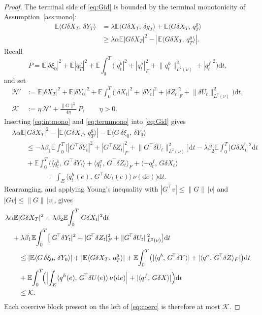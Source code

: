 \documentclass[preprint,12pt]{elsarticle}
\newcommand{\E}{\mathbb{E}}
\newcommand{\diff}{\mathrm{d}}
\newcommand{\inner}[2]{\langle #1,\,#2\rangle}
\newcommand{\Lnu}{L^2(\nu)}
\newcommand{\Gstar}{G^{\!\top}}
\newcommand{\Lnorm}[1]{\lVert #1\rVert_{\Lnu}}
\numberwithin{equation}{section}
\theoremstyle{plain}
\theoremstyle{definition}
\theoremstyle{\PaperRemarkStyle}
\begin{document}
\begin{proof}
The terminal side of \eqref{eq:Gid} is bounded by the terminal monotonicity of
Assumption~\ref{ass:mono}:
\begin{equation}\label{eq:termmono}
\begin{aligned}
\E\inner{G\delta X_T}{\delta Y_T}
&=\lambda\E\inner{G\delta X_T}{\delta g_T}+\E\inner{G\delta X_T}{q^g_T}\\
&\ge\lambda\alpha\E|G\delta X_T|^2-|\E\inner{G\delta X_T}{q^g_T}| .
\end{aligned}
\end{equation}
Recall
\[
P=\E|\delta\xi_0|^2+\E|q^g_T|^2
+\E\!\int_0^T\!\big(|q^b_t|^2+|q^\sigma_t|_F^2+\Lnorm{q^h_t}^2+|q^f_t|^2\big)\diff t ,
\]
and set
\[
\begin{aligned}
\mathcal N'&:=\E|\delta X_T|^2+\E|\delta Y_0|^2
+\E\!\int_0^T\!\big(|\delta X_t|^2+|\delta Y_t|^2+|\delta Z_t|_F^2+\Lnorm{\delta U_t}^2\big)\diff t ,\\
\mathcal K&:=\eta\,\mathcal N'+\tfrac{\|G\|^2}{4\eta}\,P ,\qquad \eta>0 .
\end{aligned}
\]
Inserting \eqref{eq:intmono} and \eqref{eq:termmono} into \eqref{eq:Gid} gives
\[
\begin{aligned}
&\lambda\alpha\E|G\delta X_T|^2-|\E\inner{G\delta X_T}{q^g_T}|-\E\inner{G\,\delta\xi_0}{\delta Y_0}\\
&\qquad\le-\lambda\beta_1\E\!\int_0^T\!\big[|\Gstar\delta Y_t|^2+|\Gstar\delta Z_t|_F^2+\Lnorm{\Gstar\delta U_t}^2\big]\diff t
-\lambda\beta_2\E\!\int_0^T\!|G\delta X_t|^2\diff t\\
&\qquad+\E\!\int_0^T\!\Big(\inner{q^b_t}{\Gstar\delta Y_t}+\inner{q^\sigma_t}{\Gstar\delta Z_t}_F
+\inner{-q^f_t}{G\delta X_t}\\
&\qquad\qquad\quad+\int_E\inner{q^h_t(e)}{\Gstar\delta U_t(e)}\,\nu(\diff e)\Big)\diff t .
\end{aligned}
\]
Rearranging, and applying Young's inequality with $|\Gstar v|\le\|G\|\,|v|$ and
$|Gv|\le\|G\|\,|v|$, gives
\begin{equation}\label{eq:coerc}
\begin{aligned}
&\lambda\alpha\E|G\delta X_T|^2+\lambda\beta_2\E\!\int_0^T\!|G\delta X_t|^2\diff t\\
&\quad+\lambda\beta_1\E\!\int_0^T\!\big[|\Gstar\delta Y_t|^2+|\Gstar\delta Z_t|_F^2+\Lnorm{\Gstar\delta U_t}^2\big]\diff t\\
&\qquad\le|\E\inner{G\,\delta\xi_0}{\delta Y_0}|+|\E\inner{G\delta X_T}{q^g_T}|
+\E\!\int_0^T\!\big(|\inner{q^b}{\Gstar\delta Y}|+|\inner{q^\sigma}{\Gstar\delta Z}_F|\big)\diff t\\
&\qquad+\E\!\int_0^T\!\Bigl(\Bigl|\int_E\inner{q^h(e)}{\Gstar\delta U(e)}\,\nu(\diff e)\Bigr|
+|\inner{q^f}{G\delta X}|\Bigr)\diff t\\
&\qquad\le\mathcal K .
\end{aligned}
\end{equation}
Each coercive block present on the left of \eqref{eq:coerc} is therefore at most
$\mathcal K$.


\end{proof}
\end{document}

